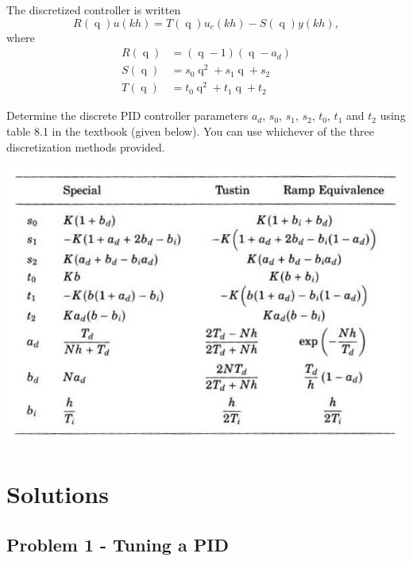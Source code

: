\documentclass[a4paper]{scrartcl}
\newcommand*{\shift}{\operatorname{q}}
\begin{document}
The discretized controller is written
\[ R(\shift) u(kh) = T(\shift) u_c(kh) - S(\shift) y(kh), \]
where
\begin{align*}
 R(\shift) &= (\shift -1)(\shift - a_d)\\
 S(\shift) &= s_0\shift^2 + s_1\shift + s_2\\
T(\shift) &= t_0\shift^2 + t_1\shift + t_2
\end{align*}

Determine the discrete PID controller parameters $a_d$, $s_0$, $s_1$, $s_2$, $t_0$, $t_1$ and $t_2$ using table 8.1 in the textbook (given below). You can use whichever of the three discretization methods provided.

\begin{center}
\includegraphics[width=0.7\linewidth]{../figures/table8-1.png}
\end{center}

\section*{Solutions}
\label{sec-3}
\subsection*{Problem 1 - Tuning a PID}
\label{sec-3-1}
\end{document}
